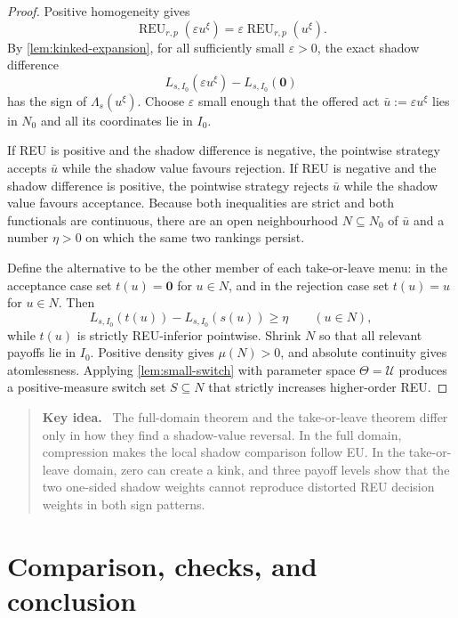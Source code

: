 \documentclass[11pt,a4paper]{article}
\theoremstyle{definition}
\newcommand{\REU}{\operatorname{REU}}
\newcommand{\U}{\mathcal U}
\newcommand{\zero}{\mathbf 0}
\newenvironment{keyidea}
  {\begin{quote}\color{MidnightBlue}\textbf{Key idea.}\ }
  {\end{quote}}
\begin{document}
\begin{proof}
Positive homogeneity gives
\[
 \REU_{r,p}(\varepsilon u^\xi)
 =\varepsilon\REU_{r,p}(u^\xi).
\]
By \cref{lem:kinked-expansion}, for all sufficiently small
$\varepsilon>0$, the exact shadow difference
\[
 L_{s,I_0}(\varepsilon u^\xi)-L_{s,I_0}(\zero)
\]
has the sign of $\Lambda_s(u^\xi)$. Choose $\varepsilon$ small enough that the
offered act $\bar u:=\varepsilon u^\xi$ lies in $N_0$ and all its coordinates lie
in $I_0$.

If REU is positive and the shadow difference is negative, the pointwise
strategy accepts $\bar u$ while the shadow value favours rejection. If REU is
negative and the shadow difference is positive, the pointwise strategy rejects
$\bar u$ while the shadow value favours acceptance. Because both inequalities
are strict and both functionals are continuous, there are an open
neighbourhood $N\subseteq N_0$ of $\bar u$ and a number $\eta>0$ on which the
same two rankings persist.

Define the alternative to be the other member of each take-or-leave menu: in
the acceptance case set $t(u)=\zero$ for $u\in N$, and in the rejection case
set $t(u)=u$ for $u\in N$. Then
\[
 L_{s,I_0}(t(u))-L_{s,I_0}(s(u))\geq\eta
 \qquad(u\in N),
\]
while $t(u)$ is strictly REU-inferior pointwise. Shrink $N$ so that all
relevant payoffs lie in $I_0$. Positive density gives $\mu(N)>0$, and absolute
continuity gives atomlessness. Applying \cref{lem:small-switch} with parameter
space $\Theta=\U$ produces a positive-measure switch set $S\subseteq N$ that
strictly increases higher-order REU.
\end{proof}

\begin{keyidea}
The full-domain theorem and the take-or-leave theorem differ only in how they
find a shadow-value reversal. In the full domain, compression makes the local
shadow comparison follow EU. In the take-or-leave domain, zero can create a
kink, and three payoff levels show that the two one-sided shadow weights cannot
reproduce distorted REU decision weights in both sign patterns.
\end{keyidea}

\section{Comparison, checks, and conclusion}
\end{document}
